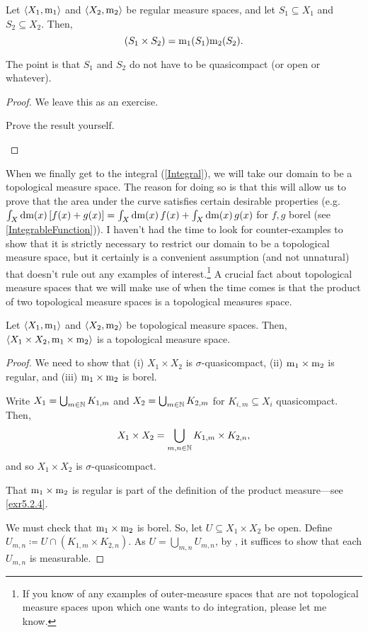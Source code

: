 \begin{prp}
Let $\langle X_1,\mathrm{m} _1\rangle$ and $\langle X_2,\mathrm{m} _2\rangle$ be regular measure spaces, and let $S_1\subseteq X_1$ and $S_2\subseteq X_2$.  Then,
\begin{equation}
[\meas _1\times \meas _2](S_1\times S_2)=\meas _1(S_1)\meas _2(S_2).
\end{equation}
\begin{rmk}
The point is that $S_1$ and $S_2$ do not have to be quasicompact (or open or whatever).
\end{rmk}
\begin{proof}
We leave this as an exercise.
\begin{exr}
Prove the result yourself.
\end{exr}
\end{proof}
\end{prp}
When we finally get to the integral (\cref{Integral}), we will take our domain to be a topological measure space.  The reason for doing so is that this will allow us to prove that the area under the curve satisfies certain desirable properties (e.g.~$\int _X\mathop{}\!\mathrm{d} \mathrm{m} (x)\, [f(x)+g(x)]=\int _X\mathop{}\!\mathrm{d} \mathrm{m} (x)\, f(x)+\int _X\mathop{}\!\mathrm{d} \mathrm{m} (x)\, g(x)$ for $f,g$ borel (see \cref{IntegrableFunction})).  I haven't had the time to look for counter-examples to show that it is strictly necessary to restrict our domain to be a topological measure space, but it certainly is a convenient assumption (and not unnatural) that doesn't rule out any examples of interest.\footnote{If you know of any examples of outer-measure spaces that are not topological measure spaces upon which one wants to do integration, please let me know.}  A crucial fact about topological measure spaces that we will make use of when the time comes is that the product of two topological measure spaces is a topological measures space.
\begin{prp}
Let $\langle X_1,\mathrm{m} _1\rangle$ and $\langle X_2,\mathrm{m} _2\rangle$ be topological measure spaces.  Then, $\langle X_1\times X_2,\mathrm{m} _1\times \mathrm{m} _2\rangle$ is a topological measure space.
\begin{proof}
We need to show that (i) $X_1\times X_2$ is $\sigma$-quasicompact, (ii) $\mathrm{m} _1\times \mathrm{m} _2$ is regular, and (iii) $\mathrm{m} _1\times \mathrm{m} _2$ is borel.

Write $X_1=\bigcup _{m\in \mathbb{N}}K_{1,m}$ and $X_2=\bigcup _{m\in \mathbb{N}}K_{2,m}$ for $K_{i,m}\subseteq X_i$ quasicompact.  Then,
\begin{equation}
X_1\times X_2=\bigcup _{m,n\in \mathbb{N}}K_{1,m}\times K_{2,n},
\end{equation}
and so $X_1\times X_2$ is $\sigma$-quasicompact.

That $\mathrm{m} _1\times \mathrm{m} _2$ is regular is part of the definition of the product measure---see \cref{exr5.2.4}.

We must check that $\mathrm{m} _1\times \mathrm{m} _2$ is borel.  So, let $U\subseteq X_1\times X_2$ be open.  Define $U_{m,n}\coloneqq U\cap (K_{1,m}\times K_{2,n})$.  As $U=\bigcup _{m,n}U_{m,n}$, by , it suffices to show that each $U_{m,n}$ is measurable.
\end{proof}
\end{prp}

